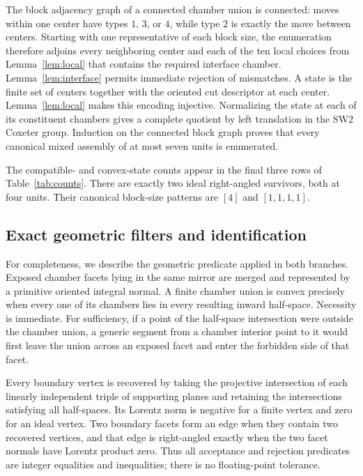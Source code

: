 \documentclass[11pt]{article}
\theoremstyle{remark}
\begin{document}
The block adjacency graph of a connected chamber union is connected: moves
within one center have types $1$, $3$, or $4$, while type $2$ is exactly the
move between centers.  Starting with one representative of each block size,
the enumeration therefore adjoins every neighboring center and each of the
ten local choices from Lemma~\ref{lem:local} that contains the required
interface chamber.  Lemma~\ref{lem:interface} permits immediate rejection
of mismatches.  A state is the finite set of centers together with the
oriented cut descriptor at each center.  Lemma~\ref{lem:local} makes this
encoding injective.  Normalizing the state at each of its constituent
chambers gives a complete quotient by left translation in the
$\mathrm{SW2}$ Coxeter group.  Induction on the connected block graph proves
that every canonical mixed assembly of at most seven units is enumerated.

The compatible- and convex-state counts appear in the final three rows of
Table~\ref{tab:counts}.  There are exactly two ideal right-angled survivors,
both at four units.  Their canonical block-size patterns are $[4]$ and
$[1,1,1,1]$.

\subsection{Exact geometric filters and identification}

For completeness, we describe the geometric predicate applied in both
branches.  Exposed chamber facets lying in the same mirror are merged and
represented by a primitive oriented integral normal.  A finite chamber union
is convex precisely when every one of its chambers lies in every resulting
inward half-space.  Necessity is immediate.  For sufficiency, if a point of
the half-space intersection were outside the chamber union, a generic segment
from a chamber interior point to it would first leave the union across an
exposed facet and enter the forbidden side of that facet.

Every boundary vertex is recovered by taking the projective intersection of
each linearly independent triple of supporting planes and retaining the
intersections satisfying all half-spaces.  Its Lorentz norm is negative for
a finite vertex and zero for an ideal vertex.  Two boundary facets form an
edge when they contain two recovered vertices, and that edge is right-angled
exactly when the two facet normals have Lorentz product zero.  Thus all
acceptance and rejection predicates are integer equalities and inequalities;
there is no floating-point tolerance.
\end{document}
